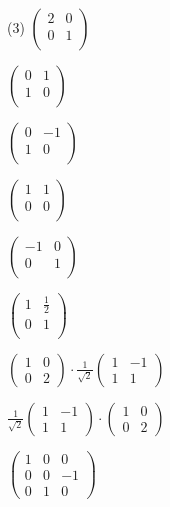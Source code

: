 \documentclass{article}
\begin{document}
\begin{tasks}[label-width=1.5em](3)
  \task $
  \begin{pmatrix} 2 & 0 \\ 0 & 1 \\
  \end{pmatrix} $

  \task $
  \begin{pmatrix} 0 & 1 \\ 1 & 0 \\
  \end{pmatrix} $

  \task $
  \begin{pmatrix} 0 & -1 \\ 1 & 0 \\
  \end{pmatrix} $

  \task $
  \begin{pmatrix} 1 & 1 \\ 0 & 0 \\
  \end{pmatrix} $

  \task $
  \begin{pmatrix} -1 & 0 \\ 0 & 1 \\
  \end{pmatrix} $

  \task $
  \begin{pmatrix} 1 & \frac{1}{2} \\ 0 & 1 \\
  \end{pmatrix} $

  \task $
  \begin{pmatrix} 1 & 0 \\ 0 & 2
  \end{pmatrix} \cdot
  \frac{1}{\sqrt{2}}
  \begin{pmatrix} 1 & -1 \\ 1 & 1
  \end{pmatrix} $

  \task $
  \frac{1}{\sqrt{2}}
  \begin{pmatrix} 1 & -1 \\ 1 & 1
  \end{pmatrix} \cdot
  \begin{pmatrix} 1 & 0 \\ 0 & 2
  \end{pmatrix} $

  \task $
  \begin{pmatrix} 1 & 0 & 0 \\ 0 & 0 & -1 \\ 0 & 1 & 0
  \end{pmatrix} $
\end{tasks}
\end{document}
